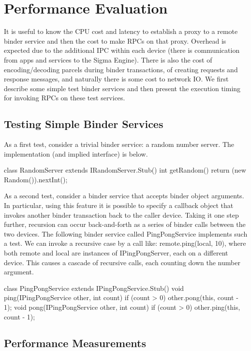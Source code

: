\documentclass[prodmode]{acmlarge}
\begin{document}
\section{Performance Evaluation}
\label{sec:Performance}
It is useful to know the CPU cost and latency to establish a proxy to a remote binder service and then the cost to make RPCs on that proxy. Overhead is expected due to the additional IPC within each device (there is communication from apps and services to the Sigma Engine). There is also the cost of encoding/decoding parcels during binder transactions, of creating requests and response messages, and naturally there is some cost to network IO. We first describe some simple test binder services and then present the execution timing for invoking RPCs on these test services.

\subsection{Testing Simple Binder Services}
As a first test, consider a trivial binder service: a random number server. The implementation (and implied interface) is below.

\begin{snippet}
class RandomServer extends IRandomServer.Stub() {
  int getRandom() { return (new Random()).nextInt(); }}
\end{snippet}

As a second test, consider a binder service that accepts binder object arguments. In particular, using this feature it is possible to specify a callback object that invokes another binder transaction back to the caller device. Taking it one step further, recursion can occur back-and-forth as a series of binder calls between the two devices. The following binder service called PingPongService implements such a test. We can invoke a recursive case by a call like: remote.ping(local, 10), where both remote and local are instances of IPingPongServer, each on a different device. This causes a cascade of recursive calls, each counting down the number argument.

\begin{snippet}
class PingPongService extends
    IPingPongService.Stub() {
  void ping(IPingPongService other, int count) {
    if (count > 0) other.pong(this, count - 1);
  }
  void pong(IPingPongService other, int count) {
    if (count > 0) other.ping(this, count - 1);
  }
}
\end{snippet}

\subsection{Performance Measurements}
\end{document}
